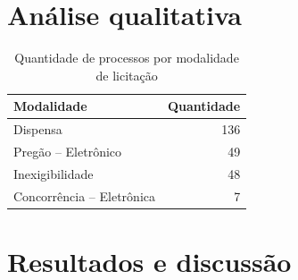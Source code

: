 \documentclass[a4paper, 12pt,brazil]{article}
\begin{document}
\section{Análise qualitativa}

\begin{table}[ht]
\centering
\begin{tabular}{lr}
\hline
\textbf{Modalidade} & \textbf{Quantidade} \\
\hline
Dispensa & 136 \\
Pregão -- Eletrônico & 49 \\
Inexigibilidade & 48 \\
Concorrência -- Eletrônica & 7 \\
\hline
\end{tabular}
\caption{Quantidade de processos por modalidade de licitação}
\label{tab:licitacoes}
\end{table}




\section{Resultados e discussão}
\end{document}
